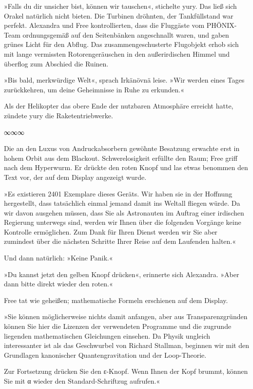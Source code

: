 »Falls du dir unsicher bist, können wir tauschen«, stichelte yury. Das ließ sich Orakel natürlich nicht bieten. Die Turbinen dröhnten, der Tankfüllstand war perfekt. Alexandra und Free kontrollierten, dass die Fluggäste vom PHÖNIX-Team ordnungsgemäß auf den Seitenbänken angeschnallt waren, und gaben grünes Licht für den Abflug. Das zusammengeschusterte Flugobjekt erhob sich mit lange vermissten Rotorengeräuschen in den außerirdischen Himmel und überflog zum Abschied die Ruinen.

»Bis bald, merkwürdige Welt«, sprach Irkänövnä leise. »Wir werden eines Tages zurückkehren, um deine Geheimnisse in Ruhe zu erkunden.«

Als der Helikopter das obere Ende der nutzbaren Atmosphäre erreicht hatte, zündete yury die Raketentriebwerke.

\begin{center}
∞∞∞
\end{center}

Die an den Luxus von Andruckabsorbern gewöhnte Besatzung erwachte erst in hohem Orbit aus dem Blackout. Schwerelosigkeit erfüllte den Raum; Free griff nach dem Hyperwurm. Er drückte den roten Knopf und las etwas benommen den Text vor, der auf dem Display angezeigt wurde.

»Es existieren 2401 Exemplare dieses Geräts. Wir haben sie in der Hoffnung hergestellt, dass tatsächlich einmal jemand damit ins Weltall fliegen würde. Da wir davon ausgehen müssen, dass Sie als Astronauten im Auftrag einer irdischen Regierung unterwegs sind, werden wir Ihnen über die folgenden Vorgänge keine Kontrolle ermöglichen. Zum Dank für Ihren Dienst werden wir Sie aber zumindest über die nächsten Schritte Ihrer Reise auf dem Laufenden halten.«

Und dann natürlich: »Keine Panik.«

»Du kannst jetzt den gelben Knopf drücken«, erinnerte sich Alexandra. »Aber dann bitte direkt wieder den roten.«

Free tat wie geheißen; mathematische Formeln erschienen auf dem Display.

»Sie können möglicherweise nichts damit anfangen, aber aus Transparenzgründen können Sie hier die Lizenzen der verwendeten Programme und die zugrunde liegenden mathematischen Gleichungen einsehen. Da Physik ungleich interessanter ist als das Geschwurbel von Richard Stallman, beginnen wir mit den Grundlagen kanonischer Quantengravitation und der Loop-Theorie.

Zur Fortsetzung drücken Sie den ε-Knopf. Wenn Ihnen der Kopf brummt, können Sie mit α wieder den Standard-Schriftzug aufrufen.«

